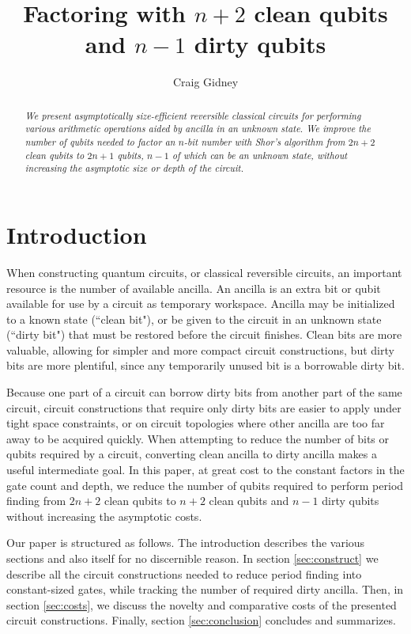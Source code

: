 \documentclass[twocolumn]{article}
\title{Factoring with $n+2$ clean qubits and $n-1$ dirty qubits}
\author{Craig Gidney}
\begin{document}
\maketitle

\begin{abstract}
\em
We present asymptotically size-efficient reversible classical circuits for performing various arithmetic operations aided by ancilla in an unknown state.
We improve the number of qubits needed to factor an $n$-bit number with Shor's algorithm \cite{Shor1999} from $2n+2$ clean qubits \cite{takahashi2006, haner2016} to $2n+1$ qubits, $n-1$ of which can be an unknown state, without increasing the asymptotic size or depth of the circuit.
\end{abstract}

\section{Introduction}

When constructing quantum circuits, or classical reversible circuits, an important resource is the number of available ancilla.
An ancilla is an extra bit or qubit available for use by a circuit as temporary workspace.
Ancilla may be initialized to a known state (``clean bit"), or be given to the circuit in an unknown state (``dirty bit") that must be restored before the circuit finishes.
Clean bits are more valuable, allowing for simpler and more compact circuit constructions, but dirty bits are more plentiful, since any temporarily unused bit is a borrowable dirty bit.

Because one part of a circuit can borrow dirty bits from another part of the same circuit, circuit constructions that require only dirty bits are easier to apply under tight space constraints, or on circuit topologies where other ancilla are too far away to be acquired quickly.
When attempting to reduce the number of bits or qubits required by a circuit, converting clean ancilla to dirty ancilla makes a useful intermediate goal.
In this paper, at great cost to the constant factors in the gate count and depth, we reduce the number of qubits required to perform period finding from $2n+2$ clean qubits \cite{takahashi2006, haner2016} to $n+2$ clean qubits and $n-1$ dirty qubits without increasing the asymptotic costs.

Our paper is structured as follows.
The introduction describes the various sections and also itself for no discernible reason.
In section \ref{sec:construct} we describe all the circuit constructions needed to reduce period finding into constant-sized gates, while tracking the number of required dirty ancilla.
Then, in section \ref{sec:costs}, we discuss the novelty and comparative costs of the presented circuit constructions.
Finally, section \ref{sec:conclusion} concludes and summarizes.
\end{document}
